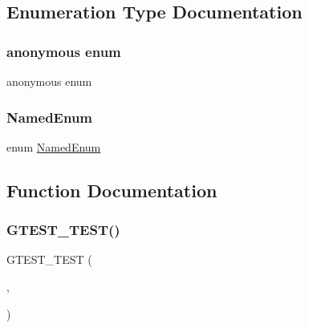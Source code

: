 \subsection{Enumeration Type Documentation}
\mbox{\label{_obj__test_2lib_2googletest-release-1_88_81_2googletest_2test_2gtest__unittest_8cc_adb49720dc49f7d4e4cf9adbf2948e409}} 
\subsubsection{\texorpdfstring{anonymous enum}{anonymous enum}}
{\footnotesize\ttfamily anonymous enum}

\mbox{\label{_obj__test_2lib_2googletest-release-1_88_81_2googletest_2test_2gtest__unittest_8cc_ae0610bad70a3b53c94ee9db54f6f732b}} 
\subsubsection{\texorpdfstring{NamedEnum}{NamedEnum}}
{\footnotesize\ttfamily enum \mbox{\hyperlink{googletest-master_2googletest_2test_2gtest__unittest_8cc_ae0610bad70a3b53c94ee9db54f6f732b}{Named\+Enum}}}



\subsection{Function Documentation}
\mbox{\label{_obj__test_2lib_2googletest-release-1_88_81_2googletest_2test_2gtest__unittest_8cc_a54247aeadc0617105812dca8609638de}} 
\subsubsection{\texorpdfstring{GTEST\_TEST()}{GTEST\_TEST()}}
{\footnotesize\ttfamily G\+T\+E\+S\+T\+\_\+\+T\+E\+ST (\begin{DoxyParamCaption}\item[{Alternative\+Name\+Test}]{,  }\item[{Works}]{ }\end{DoxyParamCaption})}

